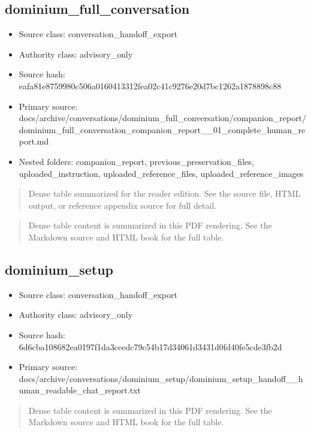 \documentclass[11pt,a4paper]{report}
\begin{document}
\subsection{dominium\_full\_conversation}

\begin{itemize}
\item Source class: conversation\_handoff\_export
\item Authority class: advisory\_only
\item Source hash: eafa81e8759980c506a0160413312fea02c41c9276e20d7bc1262a1878898c88
\item Primary source: docs/archive/conversations/dominium\_full\_conversation/companion\_report/dominium\_full\_conversation\_companion\_report\_\_01\_complete\_human\_report.md
\item Nested folders: companion\_report, previous\_preservation\_files, uploaded\_instruction, uploaded\_reference\_files, uploaded\_reference\_images
\end{itemize}


\begin{quote}\small Dense table summarized for the reader edition. See the source file, HTML output, or reference appendix source for full detail.\end{quote}

\begin{quote}\small Dense table content is summarized in this PDF rendering. See the Markdown source and HTML book for the full table.\end{quote}


\subsection{dominium\_setup}

\begin{itemize}
\item Source class: conversation\_handoff\_export
\item Authority class: advisory\_only
\item Source hash: 6d6cba108682ea0197f1da3ceedc79c54b17d34061d3431d0fd40fe5cde3fb2d
\item Primary source: docs/archive/conversations/dominium\_setup/dominium\_setup\_handoff\_\_human\_readable\_chat\_report.txt
\end{itemize}

\begin{quote}\small Dense table content is summarized in this PDF rendering. See the Markdown source and HTML book for the full table.\end{quote}
\end{document}
